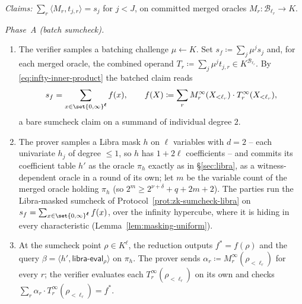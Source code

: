 \documentclass{article}
\theoremstyle{definition}
\newcommand{\BB}{\mathcal{B}}
\begin{document}
\begin{protocol}
\label{prot:batched-zk-basefold}
\emph{Claims:} $\sum_r \langle M_r, t_{j, r} \rangle = s_j$ for $j < J$, on committed merged oracles $M_r \colon \BB_{\ell_r} \to K$.

\emph{Phase~A (batch sumcheck).}
\begin{enumerate}
\item The verifier samples a batching challenge $\mu \gets K$. Set $s_f \coloneqq \sum_j \mu^j s_j$ and, for each merged oracle, the combined operand $T_r \coloneqq \sum_j \mu^j t_{j, r} \in K^{\BB_{\ell_r}}$. By \eqref{eq:infty-inner-product} the batched claim reads
\[
  s_f = \sum_{x \in \set{0, \infty}^{\boldsymbol{\ell}}} f(x), \qquad f(X) \coloneqq \sum_r M_r^\infty(X_{< \ell_r}) \cdot T_r^\infty(X_{< \ell_r}),
\]
a bare sumcheck claim on a summand of individual degree $2$.
\item The prover samples a Libra mask $h$ on $\boldsymbol{\ell}$ variables with $d = 2$ -- each univariate $h_j$ of degree $\le 1$, so $h$ has $1 + 2\boldsymbol{\ell}$ coefficients -- and commits its coefficient table $h'$ as the oracle $\pi_h$ exactly as in \S\ref{sec:libra}, as a witness-dependent oracle in a round of its own; let $m$ be the variable count of the merged oracle holding $\pi_h$ (so $2^m \ge 2^{\nu + \delta} + q + 2m + 2$). The parties run the Libra-masked sumcheck of Protocol~\ref{prot:zk-sumcheck-libra} on $s_f = \sum_{x \in \set{0, \infty}^{\boldsymbol{\ell}}} f(x)$, over the infinity hypercube, where it is hiding in every characteristic (Lemma~\ref{lem:masking-uniform}).
\item At the sumcheck point $\rho \in K^{\boldsymbol{\ell}}$, the reduction outputs $f^* = f(\rho)$ and the query $\beta = \langle h', \textsf{libra-eval}_\rho \rangle$ on $\pi_h$. The prover sends $\alpha_r \coloneqq M_r^\infty(\rho_{< \ell_r})$ for every $r$; the verifier evaluates each $T_r^\infty(\rho_{< \ell_r})$ on its own and checks $\sum_r \alpha_r \cdot T_r^\infty(\rho_{< \ell_r}) = f^*$.
\end{enumerate}


\end{protocol}
\end{document}
